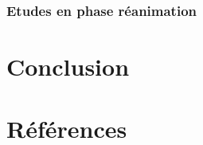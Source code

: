\documentclass[
  letterpaper,
  DIV=11,
  numbers=noendperiod]{scrartcl}
\begin{document}
\hypertarget{etudes-en-phase-ruxe9animation}{%
\subsubsection{Etudes en phase
réanimation}\label{etudes-en-phase-ruxe9animation}}

\newpage{}

\hypertarget{conclusion}{%
\section{Conclusion}\label{conclusion}}

\newpage{}

\hypertarget{ruxe9fuxe9rences}{%
\section*{Références}\label{ruxe9fuxe9rences}}
\end{document}
